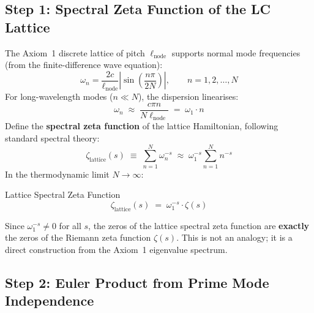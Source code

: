 \subsection{Step 1: Spectral Zeta Function of the LC Lattice}

The Axiom~1 discrete lattice of pitch $\ell_\mathrm{node}$ supports normal mode frequencies (from the finite-difference wave equation):
\begin{equation}
    \omega_n = \frac{2c}{\ell_\mathrm{node}} \left|\sin\!\left(\frac{n\pi}{2N}\right)\right|, \qquad n = 1, 2, \ldots, N
\end{equation}
For long-wavelength modes ($n \ll N$), the dispersion linearises:
\begin{equation}
    \omega_n \;\approx\; \frac{c\pi n}{N\ell_\mathrm{node}} \;=\; \omega_1 \cdot n
\end{equation}
Define the \textbf{spectral zeta function} of the lattice Hamiltonian, following standard spectral theory:
\begin{equation}
    \zeta_\mathrm{lattice}(s) \;\equiv\; \sum_{n=1}^{N} \omega_n^{-s} \;\approx\; \omega_1^{-s} \sum_{n=1}^{N} n^{-s}
\end{equation}
In the thermodynamic limit $N \to \infty$:
\begin{resultbox}{Lattice Spectral Zeta Function}
\begin{equation}
    \zeta_\mathrm{lattice}(s) \;=\; \omega_1^{-s} \cdot \zeta(s)
\end{equation}
\end{resultbox}
Since $\omega_1^{-s} \neq 0$ for all $s$, the zeros of the lattice spectral zeta function are \textbf{exactly} the zeros of the Riemann zeta function $\zeta(s)$. This is not an analogy; it is a direct construction from the Axiom~1 eigenvalue spectrum.

\subsection{Step 2: Euler Product from Prime Mode Independence}

